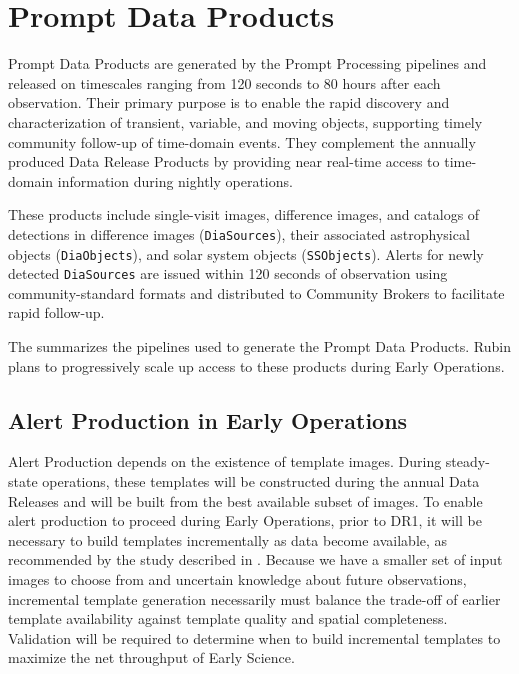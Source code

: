 \section{Prompt Data Products}
\label{sec:prompt-products}

Prompt Data Products are generated by the Prompt Processing pipelines and released on timescales ranging from 120 seconds to 80 hours after each observation.
Their primary purpose is to enable the rapid discovery and characterization of transient, variable, and moving objects, supporting timely community follow-up of time-domain events.
They complement the annually produced Data Release Products by providing near real-time access to time-domain information during nightly operations.

These products include single-visit images, difference images, and catalogs of detections in difference images (\texttt{DiaSources}), their associated astrophysical objects (\texttt{DiaObjects}), and solar system objects (\texttt{SSObjects}).
Alerts for newly detected \texttt{DiaSources} are issued within 120 seconds of observation using community-standard formats and distributed to Community Brokers to facilitate rapid follow-up.

The \DPDD{} summarizes the pipelines used to generate the Prompt Data Products.
Rubin plans to progressively scale up access to these products during Early Operations.

\subsection{Alert Production in Early Operations}
\label{ssec:ap}

Alert Production depends on the existence of template images.
During steady-state operations, these templates will be constructed during the annual Data Releases and will be built from the best available subset of images.
To enable alert production to proceed during Early Operations, prior to DR1,  it will be necessary to build templates incrementally as data become available, as recommended by the study described in .
Because we have a smaller set of input images to choose from and uncertain knowledge about future observations, incremental template generation necessarily must balance the trade-off of earlier template availability against template quality and spatial completeness.
Validation will be required to determine when to build incremental templates to maximize the net throughput of Early Science.

